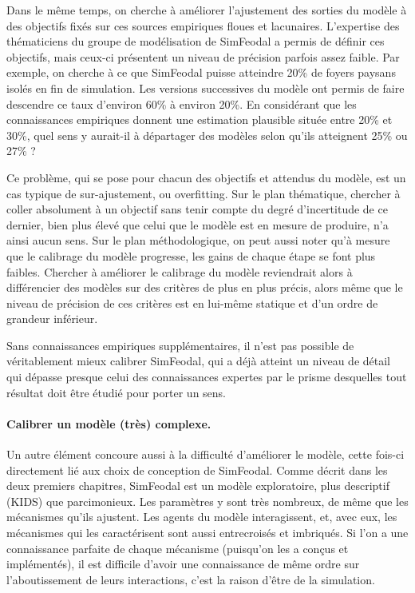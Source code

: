 Dans le même temps, on cherche à améliorer l'ajustement des sorties du modèle à des objectifs fixés sur ces sources empiriques floues et lacunaires.
L'expertise des thématiciens du groupe de modélisation de SimFeodal a permis de définir ces objectifs, mais ceux-ci présentent un niveau de précision parfois assez faible.
Par exemple, on cherche à ce que SimFeodal puisse atteindre 20\% de foyers paysans isolés en fin de simulation.
Les versions successives du modèle ont permis de faire descendre ce taux d'environ 60\% à environ 20\%.
En considérant que les connaissances empiriques donnent une estimation plausible située entre 20\% et 30\%, quel sens y aurait-il à départager des modèles selon qu'ils atteignent 25\% ou 27\% ?

Ce problème, qui se pose pour chacun des objectifs et attendus du modèle, est un cas typique de sur-ajustement, ou \og overfitting\fg{}.
Sur le plan thématique, chercher à coller absolument à un objectif sans tenir compte du degré d'incertitude de ce dernier, bien plus élevé que celui que le modèle est en mesure de produire, n'a ainsi aucun sens.
Sur le plan méthodologique, on peut aussi noter qu'à mesure que le calibrage du modèle progresse, les \og gains\fg{} de chaque étape se font plus faibles.
Chercher à améliorer le calibrage du modèle reviendrait alors à différencier des modèles sur des critères de plus en plus précis, alors même que le niveau de précision de ces critères est en lui-même statique et d'un ordre de grandeur inférieur.

Sans connaissances empiriques supplémentaires, il n'est pas possible de véritablement mieux calibrer SimFeodal, qui a déjà atteint un niveau de détail qui dépasse presque celui des connaissances expertes par le prisme desquelles tout résultat doit être étudié pour porter un sens.


\paragraph{Calibrer un modèle (très) complexe.}
Un autre élément concoure aussi à la difficulté d'améliorer le modèle, cette fois-ci directement lié aux choix de conception de SimFeodal.
Comme décrit dans les deux premiers chapitres, SimFeodal est un modèle exploratoire, plus descriptif (KIDS) que parcimonieux.
Les paramètres y sont très nombreux, de même que les mécanismes qu'ils ajustent.
Les agents du modèle interagissent, et, avec eux, les mécanismes qui les caractérisent sont aussi entrecroisés et imbriqués.
Si l'on a une connaissance parfaite de chaque mécanisme (puisqu'on les a conçus et implémentés), il est difficile d'avoir une connaissance de même ordre sur l'aboutissement de leurs interactions, c'est la raison d'être de la simulation.

